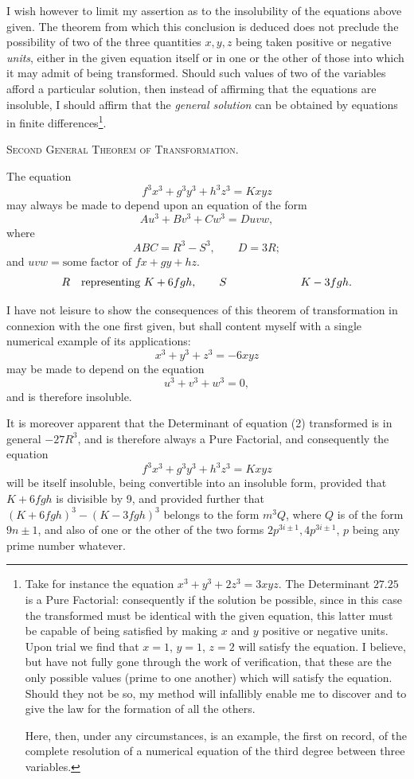 \documentclass[11pt]{article}
\newcommand{\sourcepage}[1]{\marginpar{\scriptsize p.~#1}}
\begin{document}
I wish however to limit my assertion as to the insolubility of the equations above given. The theorem from which this conclusion is deduced does not preclude the possibility of two of the three quantities $x,y,z$ being taken positive or negative \emph{units}, either in the given equation itself or in one or the other of those into which it may admit of being transformed. Should such values of two of the variables afford a particular solution, then instead of affirming that the equations are insoluble, I should affirm that the \emph{general solution} can be obtained by equations in finite differences\footnote{Take for instance the equation $x^3+y^3+2z^3=3xyz$. The Determinant $27.25$ is a Pure Factorial: consequently if the solution be possible, since in this case the transformed must be identical with the given equation, this latter must be capable of being satisfied by making $x$ and $y$ positive or negative units. Upon trial we find that $x=1$, $y=1$, $z=2$ will satisfy the equation. I believe, but have not fully gone through the work of verification, that these are the only possible values (prime to one another) which will satisfy the equation. Should they not be so, my method will infallibly enable me to discover and to give the law for the formation of all the others.

Here, then, under any circumstances, is an example, the first on record, of the complete resolution of a numerical equation of the third degree between three variables.}.

\begin{center}
{\scshape Second General Theorem of Transformation.}
\end{center}

The equation
\[
f^3x^3+g^3y^3+h^3z^3=Kxyz \tag{2}
\]
may always be made to depend upon an equation of the form
\[
Au^3+Bv^3+Cw^3=Duvw,
\]
where
\[
ABC=R^3-S^3,
\qquad
D=3R;
\]
and $uvw=\text{some factor of }fx+gy+hz$.
\[
R\quad\text{representing }K+6fgh,
\qquad
S\quad\text{\phantom{representing }}K-3fgh.
\]

\sourcepage{109}
I have not leisure to show the consequences of this theorem of transformation in connexion with the one first given, but shall content myself with a single numerical example of its applications:
\[
x^3+y^3+z^3=-6xyz
\]
may be made to depend on the equation
\[
u^3+v^3+w^3=0,
\]
and is therefore insoluble.

It is moreover apparent that the Determinant of equation (2) transformed is in general $-27R^3$, and is therefore always a Pure Factorial, and consequently the equation
\[
f^3x^3+g^3y^3+h^3z^3=Kxyz
\]
will be itself insoluble, being convertible into an insoluble form, provided that $K+6fgh$ is divisible by 9, and provided further that $(K+6fgh)^3-(K-3fgh)^3$ belongs to the form $m^3Q$, where $Q$ is of the form $9n\pm1$, and also of one or the other of the two forms $2p^{3i\pm1},4p^{3i\pm1}$, $p$ being any prime number whatever.
\end{document}
